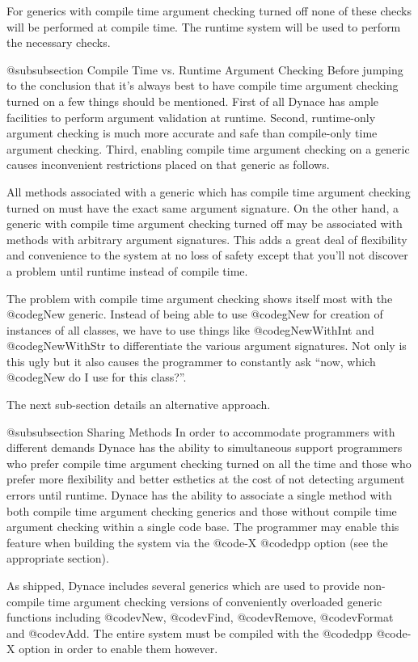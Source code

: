 For generics with compile time argument checking turned off none of
these checks will be performed at compile time.  The runtime system
will be used to perform the necessary checks.

@subsubsection Compile Time vs. Runtime Argument Checking
Before jumping to the conclusion that it's always best to have compile
time argument checking turned on a few things should be mentioned.
First of all Dynace has ample facilities to perform argument validation
at runtime.  Second, runtime-only argument checking is much more accurate
and safe than compile-only time argument checking.  Third, enabling
compile time argument checking on a generic causes inconvenient
restrictions placed on that generic as follows.

All methods associated with a generic which has compile time argument
checking turned on must have the exact same argument signature.  On the
other hand, a generic with compile time argument checking turned off
may be associated with methods with arbitrary argument signatures.
This adds a great deal of flexibility and convenience to the system
at no loss of safety except that you'll not discover a problem
until runtime instead of compile time.


The problem with compile time argument checking shows itself most with
the @code{gNew} generic.  Instead of being able to use @code{gNew}
for creation of instances of all classes, we have to use things
like @code{gNewWithInt} and @code{gNewWithStr} to differentiate
the various argument signatures.  Not only is this ugly but it also
causes the programmer to constantly ask ``now, which @code{gNew} do
I use for this class?''.

The next sub-section details an alternative approach.

@subsubsection Sharing Methods
In order to accommodate programmers with different demands Dynace has the
ability to simultaneous support programmers who prefer compile time
argument checking turned on all the time and those who prefer more
flexibility and better esthetics at the cost of not detecting argument 
errors until runtime.  Dynace has the ability to associate a single
method with both compile time argument checking generics and those
without compile time argument checking within a single code base.  The
programmer may enable this feature when building the system via the
@code{-X} @code{dpp} option (see the appropriate section).

As shipped, Dynace includes several generics which are used to provide
non-compile time argument checking versions of conveniently overloaded
generic functions including @code{vNew}, @code{vFind}, @code{vRemove},
@code{vFormat} and @code{vAdd}.  The entire system must be compiled with
the @code{dpp} @code{-X} option in order to enable them however.


